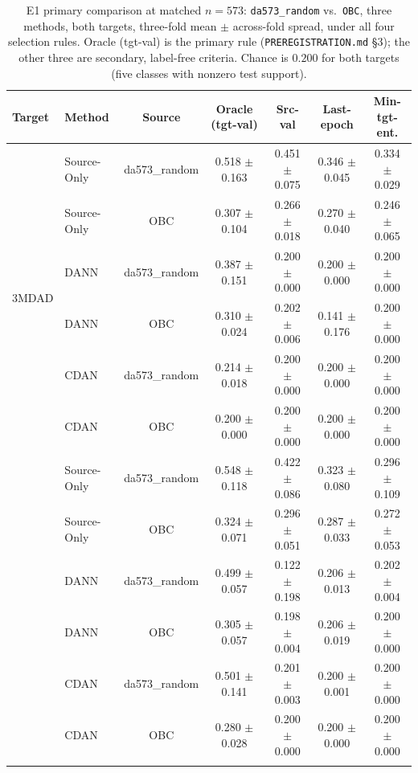 \begin{table}[t]
\centering
\caption{E1 primary comparison at matched $n{=}573$: \texttt{da573\_random} vs.\ \texttt{OBC}, three methods, both targets, three-fold mean $\pm$ across-fold spread, under all four selection rules. Oracle (tgt-val) is the primary rule (\texttt{PREREGISTRATION.md} \S3); the other three are secondary, label-free criteria. Chance is $0.200$ for both targets (five classes with nonzero test support).}
\label{tab:e1_source_comparison}
\footnotesize
\setlength{\tabcolsep}{4pt}
\begin{tabular}{llccccc}
\toprule
Target & Method & Source & Oracle (tgt-val) & Src-val & Last-epoch & Min-tgt-ent. \\
\midrule
\multirow{6}{*}{3MDAD}
  & Source-Only & da573\_random & 0.518 $\pm$ 0.163 & 0.451 $\pm$ 0.075 & 0.346 $\pm$ 0.045 & 0.334 $\pm$ 0.029 \\
  & Source-Only & OBC & 0.307 $\pm$ 0.104 & 0.266 $\pm$ 0.018 & 0.270 $\pm$ 0.040 & 0.246 $\pm$ 0.065 \\
\addlinespace[1pt]
  & DANN & da573\_random & 0.387 $\pm$ 0.151 & 0.200 $\pm$ 0.000 & 0.200 $\pm$ 0.000 & 0.200 $\pm$ 0.000 \\
  & DANN & OBC & 0.310 $\pm$ 0.024 & 0.202 $\pm$ 0.006 & 0.141 $\pm$ 0.176 & 0.200 $\pm$ 0.000 \\
\addlinespace[1pt]
  & CDAN & da573\_random & 0.214 $\pm$ 0.018 & 0.200 $\pm$ 0.000 & 0.200 $\pm$ 0.000 & 0.200 $\pm$ 0.000 \\
  & CDAN & OBC & 0.200 $\pm$ 0.000 & 0.200 $\pm$ 0.000 & 0.200 $\pm$ 0.000 & 0.200 $\pm$ 0.000 \\
\addlinespace[1pt]
\midrule
\multirow{6}{*}{DMD}
  & Source-Only & da573\_random & 0.548 $\pm$ 0.118 & 0.422 $\pm$ 0.086 & 0.323 $\pm$ 0.080 & 0.296 $\pm$ 0.109 \\
  & Source-Only & OBC & 0.324 $\pm$ 0.071 & 0.296 $\pm$ 0.051 & 0.287 $\pm$ 0.033 & 0.272 $\pm$ 0.053 \\
\addlinespace[1pt]
  & DANN & da573\_random & 0.499 $\pm$ 0.057 & 0.122 $\pm$ 0.198 & 0.206 $\pm$ 0.013 & 0.202 $\pm$ 0.004 \\
  & DANN & OBC & 0.305 $\pm$ 0.057 & 0.198 $\pm$ 0.004 & 0.206 $\pm$ 0.019 & 0.200 $\pm$ 0.000 \\
\addlinespace[1pt]
  & CDAN & da573\_random & 0.501 $\pm$ 0.141 & 0.201 $\pm$ 0.003 & 0.200 $\pm$ 0.001 & 0.200 $\pm$ 0.000 \\
  & CDAN & OBC & 0.280 $\pm$ 0.028 & 0.200 $\pm$ 0.000 & 0.200 $\pm$ 0.000 & 0.200 $\pm$ 0.000 \\
\addlinespace[1pt]
\bottomrule
\end{tabular}
\end{table}
